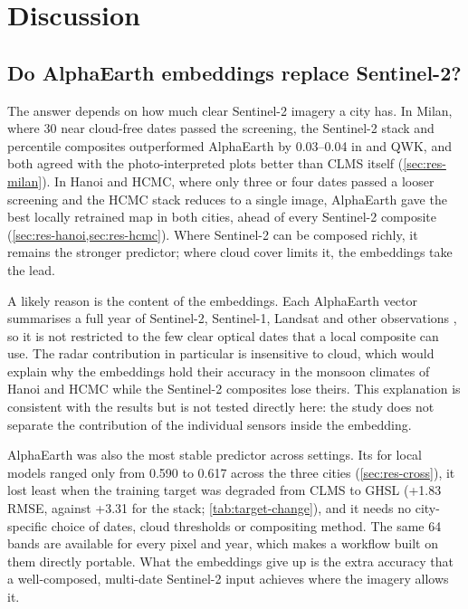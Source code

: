 %

\section{Discussion}
\label{sec:discussion}

\subsection{Do AlphaEarth embeddings replace Sentinel-2?}
\label{sec:disc-replace}

The answer depends on how much clear Sentinel-2 imagery a city has. In
Milan, where 30 near cloud-free dates passed the screening, the Sentinel-2
stack and percentile composites outperformed AlphaEarth by 0.03--0.04 in
\Rsq{} and QWK, and both agreed with the photo-interpreted plots better than
CLMS itself (\cref{sec:res-milan}). In Hanoi and HCMC, where only three or
four dates passed a looser screening and the HCMC stack reduces to a single
image, AlphaEarth gave the best locally retrained map in both cities, ahead
of every Sentinel-2 composite (\cref{sec:res-hanoi,sec:res-hcmc}). Where
Sentinel-2 can be composed richly, it remains the stronger predictor; where
cloud cover limits it, the embeddings take the lead.

A likely reason is the content of the embeddings. Each AlphaEarth vector
summarises a full year of Sentinel-2, Sentinel-1, Landsat and other
observations \cite{brown2025alphaearth}, so it is not restricted to the few
clear optical dates that a local composite can use. The radar contribution in
particular is insensitive to cloud, which would explain why the embeddings
hold their accuracy in the monsoon climates of Hanoi and HCMC while the
Sentinel-2 composites lose theirs. This explanation is consistent with the
results but is not tested directly here: the study does not separate the
contribution of the individual sensors inside the embedding.

AlphaEarth was also the most stable predictor across settings. Its \Rsq{} for
local models ranged only from 0.590 to 0.617 across the three cities
(\cref{sec:res-cross}), it lost least when the training target was degraded
from CLMS to GHSL (+1.83\pp{} RMSE, against +3.31\pp{} for the stack;
\cref{tab:target-change}), and it needs no city-specific choice of dates,
cloud thresholds or compositing method. The same 64 bands are available for
every pixel and year, which makes a workflow built on them directly
portable. What the embeddings give up is the extra accuracy that a
well-composed, multi-date Sentinel-2 input achieves where the imagery allows
it.

